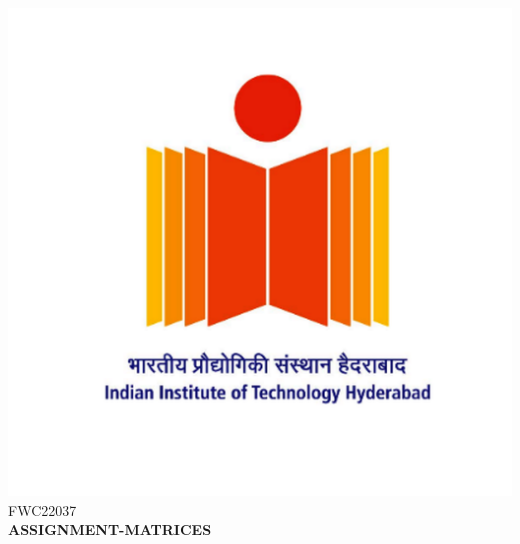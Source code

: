 \documentclass[a4paper,10pt]{report}
\begin{document}
\raggedright{\includegraphics[scale=0.04]{logo.png}}\hspace{12.425cm}\raggedleft FWC22037\vspace{2mm}
\\
\centering\Large\textbf{ASSIGNMENT-MATRICES}\vspace{5mm}
\end{document}
